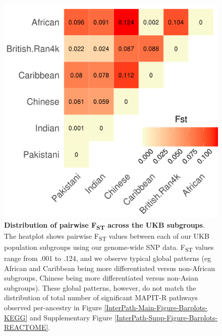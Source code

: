\documentclass[12pt,a4paper]{article}
\begin{document}
\begin{figure}[htb]
\centering
\includegraphics[scale=.5]{Images/Main/InterPath_Main_Figure_Fst_vs2.png}
\caption[TBD]{\textbf{Distribution of pairwise F\textsubscript{ST} across the UKB subgroups}. The heatplot shows pairwise F\textsubscript{ST} values between each of our UKB population subgroups using our genome-wide SNP data. F\textsubscript{ST} values range from .001 to .124, and we observe typical global patterns (eg African and Caribbean being more differentiated versus non-African subgroups, Chinese being more differentiated versus non-Asian subgroups). These global patterns, however, do not match the distribution of total number of significant MAPIT-R pathways observed per-ancestry in Figure \ref{InterPath-Main-Figure-Barplots-KEGG} and Supplementary Figure \ref{InterPath-Supp-Figure-Barplots-REACTOME}.}
\label{InterPath-Main-Figure-Fst}
\end{figure}
\end{document}
